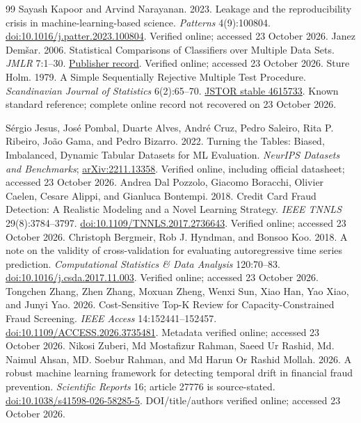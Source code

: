 \begin{thebibliography}{99}
 Sayash Kapoor and Arvind Narayanan. 2023. Leakage and the reproducibility crisis in machine-learning-based science. \emph{Patterns} 4(9):100804. \href{https://doi.org/10.1016/j.patter.2023.100804}{doi:10.1016/j.patter.2023.100804}. Verified online; accessed 23 October 2026.
 Janez Demšar. 2006. Statistical Comparisons of Classifiers over Multiple Data Sets. \emph{JMLR} 7:1--30. \href{https://www.jmlr.org/papers/v7/demsar06a.html}{Publisher record}. Verified online; accessed 23 October 2026.
 Sture Holm. 1979. A Simple Sequentially Rejective Multiple Test Procedure. \emph{Scandinavian Journal of Statistics} 6(2):65--70. \href{https://www.jstor.org/stable/4615733}{JSTOR stable 4615733}. Known standard reference; complete online record not recovered on 23 October 2026.

\pbreak
{} Sérgio Jesus, José Pombal, Duarte Alves, André Cruz, Pedro Saleiro, Rita P. Ribeiro, João Gama, and Pedro Bizarro. 2022. Turning the Tables: Biased, Imbalanced, Dynamic Tabular Datasets for ML Evaluation. \emph{NeurIPS Datasets and Benchmarks}; \href{https://arxiv.org/abs/2211.13358}{arXiv:2211.13358}. Verified online, including official datasheet; accessed 23 October 2026.
 Andrea Dal Pozzolo, Giacomo Boracchi, Olivier Caelen, Cesare Alippi, and Gianluca Bontempi. 2018. Credit Card Fraud Detection: A Realistic Modeling and a Novel Learning Strategy. \emph{IEEE TNNLS} 29(8):3784--3797. \href{https://doi.org/10.1109/TNNLS.2017.2736643}{doi:10.1109/TNNLS.2017.2736643}. Verified online; accessed 23 October 2026.
 Christoph Bergmeir, Rob J. Hyndman, and Bonsoo Koo. 2018. A note on the validity of cross-validation for evaluating autoregressive time series prediction. \emph{Computational Statistics \& Data Analysis} 120:70--83. \href{https://doi.org/10.1016/j.csda.2017.11.003}{doi:10.1016/j.csda.2017.11.003}. Verified online; accessed 23 October 2026.
 Tongchen Zhang, Zhen Zhang, Moxuan Zheng, Wenxi Sun, Xiao Han, Yao Xiao, and Junyi Yao. 2026. Cost-Sensitive Top-K Review for Capacity-Constrained Fraud Screening. \emph{IEEE Access} 14:152441--152457. \href{https://doi.org/10.1109/ACCESS.2026.3735481}{doi:10.1109/ACCESS.2026.3735481}. Metadata verified online; accessed 23 October 2026.
 Nikosi Zuberi, Md Mostafizur Rahman, Saeed Ur Rashid, Md. Naimul Ahsan, MD. Soebur Rahman, and Md Harun Or Rashid Mollah. 2026. A robust machine learning framework for detecting temporal drift in financial fraud prevention. \emph{Scientific Reports} 16; article 27776 is source-stated. \href{https://doi.org/10.1038/s41598-026-58285-5}{doi:10.1038/s41598-026-58285-5}. DOI/title/authors verified online; accessed 23 October 2026.

\end{thebibliography}
